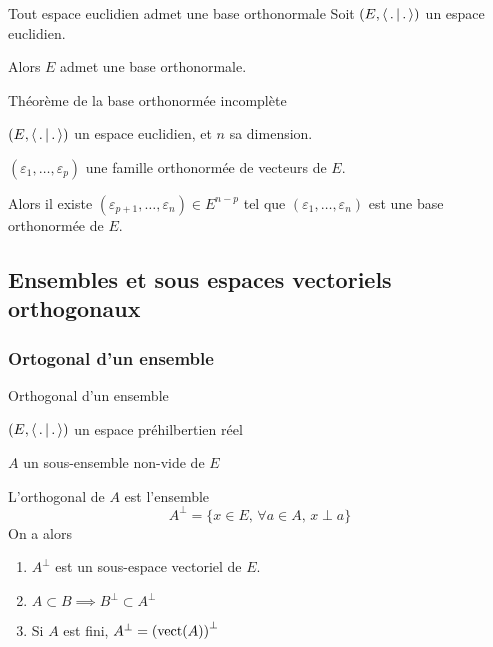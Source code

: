         \begin{coro}{Tout espace euclidien admet une base orthonormale}{}
            Soit $(E,\left<\,.\,\middle|\,.\,\right>)$ un espace euclidien.
    
            Alors $E$ admet une base orthonormale.
        \end{coro}
    
        \begin{coro}{Théorème de la base orthonormée incomplète}{}
            \begin{soient}
                \item $(E,\left<\,.\,\middle|\,.\,\right>)$ un espace euclidien, et $n$ sa dimension.
                \item $(\varepsilon_1,\ldots,\varepsilon_p)$ une famille orthonormée de vecteurs de $E$.
            \end{soient}
            Alors il existe $(\varepsilon_{p+1},\ldots,\varepsilon_n) \in E^{n-p}$ tel que $(\varepsilon_1,\ldots,\varepsilon_n)$ est une base orthonormée de $E$.
        \end{coro}

    \subsection{Ensembles et sous espaces vectoriels orthogonaux}

        \subsubsection{Ortogonal d’un ensemble}

        \begin{defitheo}{Orthogonal d’un ensemble}{}
            \begin{soient}
                \item $(E,\left<\,.\,\middle|\,.\,\right>)$ un espace préhilbertien réel
                \item $A$ un sous-ensemble non-vide de $E$
            \end{soient}
            L’orthogonal de $A$ est l’ensemble 
            \[ A^{\perp} = \{ x \in E, \, \forall a \in A, \, x \perp a \} \]
            On a alors 
            \begin{enumerate}
                \item $A^{\perp}$ est un sous-espace vectoriel de $E$.
                \item $A \subset B \implies B^{\perp} \subset A^{\perp}$
                \item Si $A$ est fini, $A^{\perp} = \left(\operatorname{vect}(A)\right)^{\perp}$
            \end{enumerate}
        \end{defitheo}

